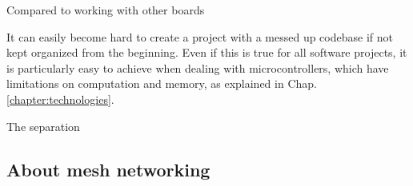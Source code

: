 			Compared to working with other boards
			
			It can easily become hard to create a project with a messed up codebase if not kept organized from the beginning.
			Even if this is true for all software projects, it is particularly easy to achieve when dealing with microcontrollers, which have limitations on computation and memory, as explained in Chap. \ref{chapter:technologies}.
			
			The separation 
			
			
		\subsection{About mesh networking}

